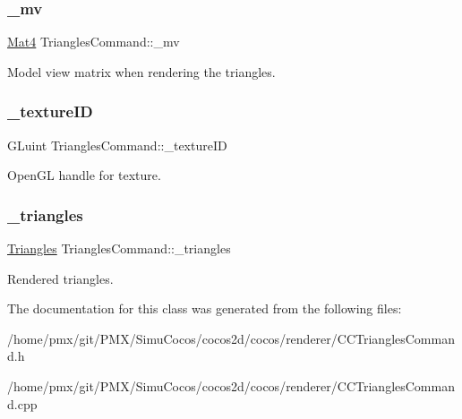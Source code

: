 \subsubsection{\texorpdfstring{\+\_\+mv}{\_mv}}
{\footnotesize\ttfamily \hyperlink{classMat4}{Mat4} Triangles\+Command\+::\+\_\+mv\hspace{0.3cm}{\ttfamily [protected]}}

Model view matrix when rendering the triangles. \mbox{\label{classTrianglesCommand_ac3a181c96ba458f8d476b4f35266503a}} 
\subsubsection{\texorpdfstring{\+\_\+texture\+ID}{\_textureID}}
{\footnotesize\ttfamily G\+Luint Triangles\+Command\+::\+\_\+texture\+ID\hspace{0.3cm}{\ttfamily [protected]}}

Open\+GL handle for texture. \mbox{\label{classTrianglesCommand_a601af16a4f1f67e7cf220c5753884ae1}} 
\subsubsection{\texorpdfstring{\+\_\+triangles}{\_triangles}}
{\footnotesize\ttfamily \hyperlink{structTrianglesCommand_1_1Triangles}{Triangles} Triangles\+Command\+::\+\_\+triangles\hspace{0.3cm}{\ttfamily [protected]}}

Rendered triangles. 

The documentation for this class was generated from the following files\+:\begin{DoxyCompactItemize}
\item 
/home/pmx/git/\+P\+M\+X/\+Simu\+Cocos/cocos2d/cocos/renderer/C\+C\+Triangles\+Command.\+h\item 
/home/pmx/git/\+P\+M\+X/\+Simu\+Cocos/cocos2d/cocos/renderer/C\+C\+Triangles\+Command.\+cpp\end{DoxyCompactItemize}
